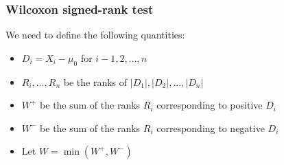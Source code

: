 \documentclass[a4paper]{article}
\begin{document}
\subsubsection{Wilcoxon signed-rank test}
We need to define the following quantities:
\begin{itemize}
	\item \( D_i = X_i - \mu_0 \) for \( i - 1,2,\dotsc,n \)
	\item \( R_i,\dotsc,R_n \) be the ranks of \( \lvert D_1 \rvert, \lvert D_2 \rvert, \dotsc, \lvert D_n \rvert \)
	\item \( W^+ \) be the sum of the ranks \( R_{i} \) corresponding to positive \( D_i \) 
	\item \( W^- \) be the sum of the ranks \( R_{i} \) corresponding to negative \( D_i \) 
	\item Let \( W = \min (W^+,W^-) \) 
\end{itemize}
\end{document}
